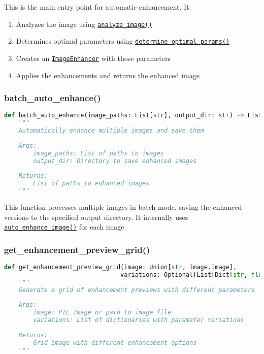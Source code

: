 This is the main entry point for automatic enhancement. It:
\begin{enumerate}
    \item Analyzes the image using \hyperref[sec:analyze_image]{\texttt{analyze\_image()}}
    \item Determines optimal parameters using \hyperref[sec:determine_optimal_params]{\texttt{determine\_optimal\_params()}}
    \item Creates an \hyperref[sec:enhancer_class]{\texttt{ImageEnhancer}} with those parameters
    \item Applies the enhancements and returns the enhanced image
\end{enumerate}

\subsubsection{batch\_auto\_enhance()}
\begin{lstlisting}[language=Python, caption=Batch Enhancement Function]
def batch_auto_enhance(image_paths: List[str], output_dir: str) -> List[str]:
    """
    Automatically enhance multiple images and save them
    
    Args:
        image_paths: List of paths to images
        output_dir: Directory to save enhanced images
        
    Returns:
        List of paths to enhanced images
    """
\end{lstlisting}

This function processes multiple images in batch mode, saving the enhanced versions to the specified output directory. It internally uses \hyperref[sec:auto_enhance_function]{\texttt{auto\_enhance\_image()}} for each image.

\subsubsection{get\_enhancement\_preview\_grid()}
\begin{lstlisting}[language=Python, caption=Preview Grid Function]
def get_enhancement_preview_grid(image: Union[str, Image.Image], 
                                variations: Optional[List[Dict[str, float]]] = None) -> Image.Image:
    """
    Generate a grid of enhancement previews with different parameters
    
    Args:
        image: PIL Image or path to image file
        variations: List of dictionaries with parameter variations
        
    Returns:
        Grid image with different enhancement options
    """
\end{lstlisting}

